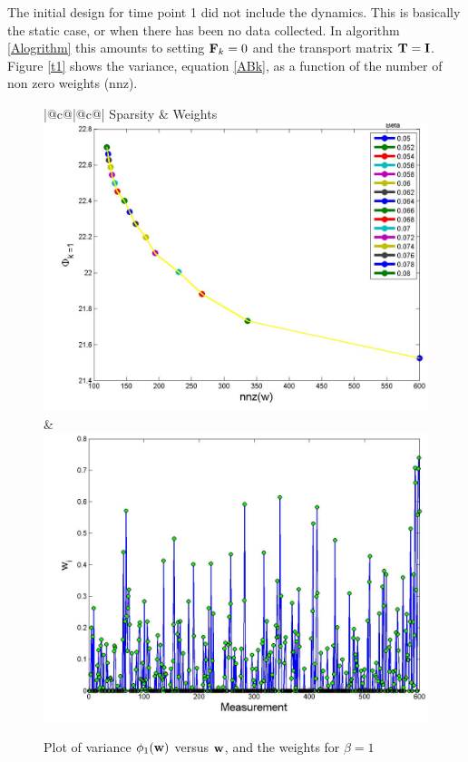 \documentclass[12pt]{article}
\newcommand{\bfF}	{{\bf{F}}}
\newcommand{\bfI}	{{\bf{I}}}
\newcommand{\bfT}	{{\bf{T}}}
\newcommand{\bfw}	{{\bf{w}}}
\begin{document}
The initial design for time point 1 did not include the dynamics. This is basically the static case, or when there has been no data collected. In algorithm \ref{Alogrithm} this amounts to setting $\bfF_k = 0$ and the transport matrix $\bfT = \bfI$. 
Figure \ref{t1} shows the  variance, equation \eqref{ABk}, as a function of the number of non zero weights (nnz).  
\begin{figure}[!h]
	\renewcommand{\arraystretch}{1.5}
	\begin{center}
		\iwidth=100mm
		\begin{tabular}{{|@{}c@{}|@{}c@{}|}} %
			\hline		
			Sparsity
			&
			Weights			
			\\
			\hline		
			\includegraphics[width=.8\iwidth]{figures/exp1paretoWeights}
			&
			\includegraphics[width=.8\iwidth]{figures/exp1Weights}
			\\
			\hline
		\end{tabular}
	\end{center}
	\caption{Plot of variance $\phi_1(\bfw)$ versus $\bfw$, and the weights for $\beta = 1$ }
	\label{fig:weights1}
\end{figure}
\end{document}
